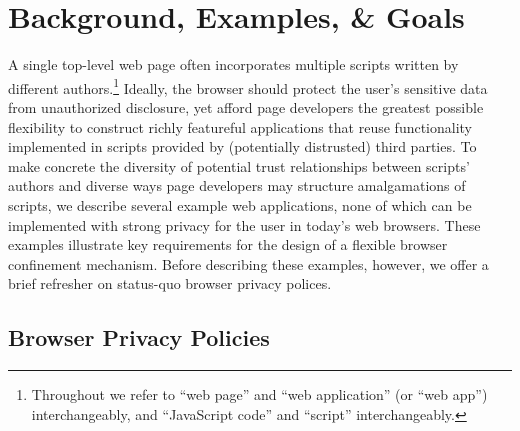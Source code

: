 \section{Background, Examples, \& Goals}

A single top-level web page often incorporates multiple scripts
written by different authors.\footnote{Throughout we refer to ``web
  page'' and ``web application'' (or ``web app'') interchangeably, and
  ``JavaScript code'' and ``script'' interchangeably.} Ideally, the
browser should protect the user's sensitive data from unauthorized
disclosure, yet afford page developers the greatest possible
flexibility to construct richly featureful applications that reuse
functionality implemented in scripts provided by (potentially
distrusted) third parties. To make concrete the diversity of potential
trust relationships between scripts' authors and diverse ways page
developers may structure amalgamations of scripts, we describe several
example web applications, none of which can be implemented with strong
privacy for the user in today's web browsers. These examples
illustrate key requirements for the design of a flexible browser
confinement mechanism. Before describing these examples, however, we
offer a brief refresher on status-quo browser privacy polices.

\subsection{Browser Privacy Policies}
\label{sec:backgd}

